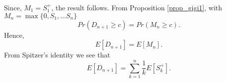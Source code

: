 \documentclass[a4paper,10pt,english]{article}
\begin{document}
Since, $M_1 =S_1^+$, the result follows. From Proposition \ref{prop_gigi1}, with $M_n=\max\{0,S_1,\hdots S_n\}$
 \begin{equation*}
Pr(D_{n+1} \geq c) = Pr(M_n \geq c).
\end{equation*}
Hence,
 \begin{equation*}
E[D_{n+1}]=E[M_n].
\end{equation*}
From Spitzer's identity we see that
 \begin{equation*}
E[D_{n+1}]= \sum_{k=1}^{n} \frac{1}{k}E[S_k^+].
\end{equation*}

\end{document}
